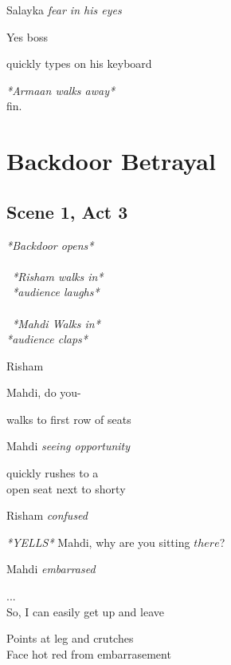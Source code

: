 \documentclass[12pt]{article}
\begin{document}
Salayka
\textit{  fear in his eyes}
\begin{center}
    Yes boss
\end{center}
\begin{flushright}
    quickly types on his keyboard\\
\end{flushright}

\begin{center}
    \textit{*Armaan walks away*}\\
    fin.
\end{center}

\newpage
\section*{Backdoor Betrayal}
\subsection*{Scene 1, Act 3}
\begin{center}
    \textit{*Backdoor opens*\\~\\~*Risham walks in*\\~*audience laughs*\\~\\~*Mahdi Walks in*\\*audience claps*}
\end{center}

Risham
\begin{center}
    Mahdi, do you-
\end{center}
\begin{flushright}
    walks to first row of seats
\end{flushright}

Mahdi
\textit{  seeing opportunity}
\begin{flushright}
    quickly rushes to a \\open seat next to shorty
\end{flushright}

Risham
\textit{  confused}
\begin{center}
    \textit{*YELLS*} 
    Mahdi, why are you sitting $there$?
\end{center}

Mahdi
\textit{  embarrased}
\begin{center}
    ...\\
    So, I can easily get up and leave
\end{center}
\begin{flushright}
    Points at leg and crutches\\Face hot red from embarrasement
\end{flushright}
\end{document}
